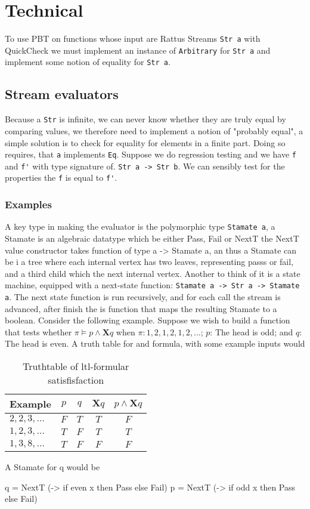 \section{Technical}
To use PBT on functions whose input are Rattus Streams \verb|Str a| with QuickCheck we must implement an instance of \verb|Arbitrary| for \verb|Str a| and implement some notion of equality for \verb|Str a|.
\subsection{Stream evaluators}
Because a \verb|Str| is infinite, we can never know whether they are truly equal by comparing values, we therefore need to implement a notion of "probably equal", a simple solution is to check for equality for elements in a finite part. Doing so requires, that \verb|a| implements \verb|Eq|.
Suppose we do regression testing and we have \verb|f| and \verb|f'| with type signature of.
\verb|Str a -> Str b|. 
We can sensibly test for the properties the \verb|f| is equal to \verb|f'|.
\subsubsection{Examples}
A key type in making the evaluator is the polymorphic type \verb|Stamate a|, a Stamate is an algebraic datatype which be either Pass, Fail or NextT the NextT value constructor takes function of type a -> Stamate a, an thus a Stamate can be i a tree where each internal vertex has two leaves, representing passs or fail, and a third child which the next internal vertex. Another to think of it is a state machine, equipped with a next-state function:  \verb|Stamate a -> Str a -> Stamate a|. The next state function is run recursively, and for each call the stream is advanced, after finish the is function that maps the resulting Stamate to a boolean.
Consider the following example.
Suppose we wish to build a function that tests whether $\pi \vDash p \wedge \mathbf{X} q $ when $\pi: 1, 2, 1, 2, 1, 2, \dots$; $p$: The head is odd; and $q$: The head is even. A truth table for and formula, with some example inputs would
\begin{table}[H]
    \centering
    \begin{tabular}{lcccc}
    \toprule
    Example            &  $p$   &  $q$ & $\mathbf{X} q $&$  p \wedge \mathbf{X} q$ \\   
    \midrule
         $2,2,3,\dots $ &  $F$   &  $T$ & $           T $&$                  F $\\
         $1,2,3,\dots $ &  $T$   &  $F$ & $           T $&$                  T $\\
         $1,3,8,\dots $ &  $T$   &  $F$ & $           F $&$                  F $ \\
    \bottomrule
    \end{tabular}
    \caption{Truthtable of \acrshort{ltl}-formular satisfisfaction}
    \label{tab:LTLSatExample}
\end{table}
A Stamate for q would be
\begin{hscode}
    q = NextT (\x -> if even x then Pass else Fail)
    p = NextT (\x -> if odd x then Pass else Fail)
\end{hscode}


